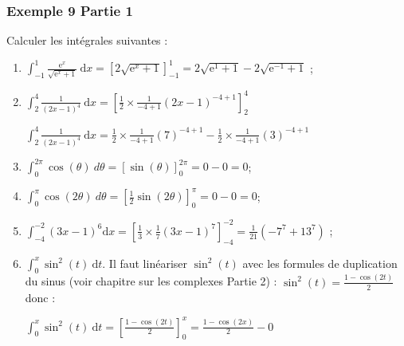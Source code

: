 \documentclass[11pt, hyperref={urlcolor=red,%
            linkcolor=blue, %
            colorlinks=true}]{beamer}
\newcommand{\dx}{\ensuremath{\text{d}x}}		%
\newcommand{\dt}{\ensuremath{\text{d}t}}		%
\begin{document}
\begin{frame}
\frametitle{Exemple  9 Partie 1}
\label{exemple9}

Calculer les intégrales suivantes :

			\begin{enumerate}
			\item $\int_{-1}^{1}\frac{\text{e}^x}{\sqrt{\text{e}^x+1}} \ \dx = \left[2\sqrt{\text{e}^x+1}\right]_{-1}^{1}=2\sqrt{\text{e}^{1}+1}-2\sqrt{\text{e}^{-1}+1}$  ;
				\item $\int_{2}^{4}\frac{1}{(2x-1)^4} \ \dx =   \left[\frac{1}{2}\times \frac{1}{-4+1}(2x-1)^{-4+1}\right]_{2}^{4}$
				
				$\int_{2}^{4}\frac{1}{(2x-1)^4} \ \dx = \frac{1}{2}\times \frac{1}{-4+1}(7)^{-4+1}- \frac{1}{2}\times \frac{1}{-4+1}(3)^{-4+1}$
				
				\item $\int_{0}^{2\pi} \cos\left( \theta \right)  \ d\theta  =  \left[\sin\left( \theta \right)\right]_{0}^{2\pi}=0-0=0$;
				
				\item $\int_{0}^{\pi} \cos \left( 2\theta \right)  \ d\theta =  \left[\frac{1}{2}\sin\left( 2\theta \right)\right]_{0}^{\pi}=0-0=0$;
							
				\item $\int_{-4}^{-2}(3x-1)^6 \dx = \left[\frac{1}{3}\times \frac{1}{7}(3x-1)^{7}\right]_{-4}^{-2}=\frac{1}{21}\left(-7^{7}+13^{7} \right)$ ;
				\item $\int_{0}^{x}\sin^2(t) \ \dt$. Il faut linéariser $\sin^{2}(t)$ avec les formules de duplication du sinus (voir chapitre sur les complexes Partie 2) : $\sin^{2}(t)=\frac{1-\cos(2t)}{2}$ donc :
				
				$\int_{0}^{x}\sin^2(t) \ \dt = \left[\frac{1-\cos(2t)}{2}\right]_{0}^{x}= \frac{1-\cos(2x)}{2}-0$
				
		
			\end{enumerate}

\end{frame}
\end{document}
